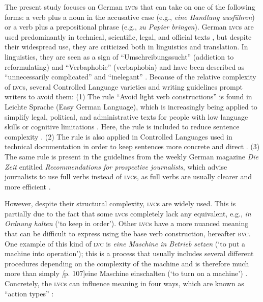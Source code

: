 \documentclass[output=paper]{langsci/langscibook}
\begin{document}
The present study focuses on German \textsc{lvc}s that can take on one of the following forms: a verb plus a noun in the accusative case (e.g., \textit{eine Handlung ausführen}) or a verb plus a prepositional phrase (e.g., \textit{zu Papier bringen}). German \textsc{lvc}s are used predominantly in technical, scientific, legal, and official texts \citep[38f.]{Bruker2013}, but despite their widespread use, they are criticized both in linguistics and translation. In linguistics, they are seen as a sign of “Umschreibungssucht” (addiction to reformulating) and “Verbaphobie” (verbaphobia) \citep[9f.]{Daniels1963} and have been described as “unnecessarily complicated” and “inelegant” \citep{Storrer2006a}. Because of the relative complexity of \textsc{lvc}s, several Controlled Language varieties and writing guidelines prompt writers to avoid them: (1) The rule “Avoid light verb constructions” is found in Leichte Sprache (Easy German Language), which is increasingly being applied to simplify legal, political, and administrative texts for people with low language skills or cognitive limitations \citep{Hansen-Schirra2018}. Here, the rule is included to reduce sentence complexity \citep{ubhd-67957969}. (2) The rule is also applied in Controlled Languages used in technical documentation in order to keep sentences more concrete and direct \citep[107]{GesellschaftfurTechnischeKommunikation2013}. (3) The same rule is present in the guidelines from the weekly German magazine \textit{Die Zeit} entitled \textit{Recommendations for prospective journalists}, which advise journalists to use full verbs instead of \textsc{lvc}s, as full verbs are usually clearer and more efficient \citep{Zeit2007}.

However, despite their structural complexity, \textsc{lvc}s are widely used. This is partially due to the fact that some \textsc{lvc}s completely lack any equivalent, e.g., \textit{in Ordnung halten} (`to keep in order'). Other \textsc{lvc}s have a more nuanced meaning that can be difficult to express using the base verb construction, hereafter \textsc{bvc}. One example of this kind of \textsc{lvc} is \textit{eine Maschine in Betrieb setzen} (`to put a machine into operation'); this is a process that usually includes several different procedures depending on the complexity of the machine and is therefore much more than simply \textit[p. 107]{eine Maschine einschalten} (`to turn on a machine') \citep{ubhd-67954849}. Concretely, the \textsc{lvc}s can influence meaning in four ways, which are known as “action types” \citep*[704]{Zifonun1997}:
\end{document}
